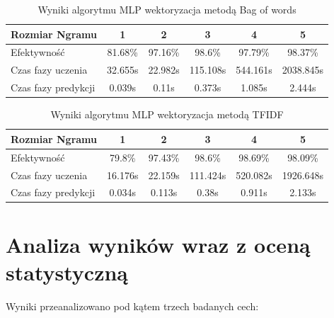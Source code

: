 \begin{table}[H]
    \centering
    \caption{Wyniki algorytmu MLP wektoryzacja metodą Bag of words}
    \begin{tabular}{ | l | c | c | c | c | c |}
        \hline
        Rozmiar Ngramu & 1 & 2 & 3 & 4 & 5  \\ \hline
        Efektywność & 81.68\% & 97.16\% & 98.6\% & 97.79\% & 98.37\%   \\ \hline
        Czas fazy uczenia & 32.655s & 22.982s & 115.108s & 544.161s & 2038.845s  \\ \hline
        Czas fazy predykcji & 0.039s & 0.11s & 0.373s & 1.085s & 2.444s  \\ \hline
    \end{tabular}
\end{table}

\begin{table}[H]
    \centering
    \caption{Wyniki algorytmu MLP wektoryzacja metodą TFIDF}
    \begin{tabular}{ | l | c | c | c | c | c |}
        \hline
        Rozmiar Ngramu & 1 & 2 & 3 & 4 & 5   \\ \hline
        Efektywność & 79.8\% & 97.43\% & 98.6\% & 98.69\% & 98.09\%   \\ \hline
        Czas fazy uczenia & 16.176s & 22.159s & 111.424s & 520.082s & 1926.648s  \\ \hline
        Czas fazy predykcji & 0.034s & 0.113s & 0.38s & 0.911s & 2.133s  \\ \hline
    \end{tabular}
\end{table}
\section{Analiza wyników wraz z oceną statystyczną}

Wyniki przeanalizowano pod kątem trzech badanych cech:


